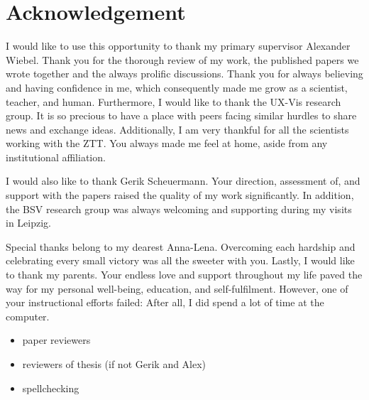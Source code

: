 %
\chapter*{Acknowledgement}
\label{sec:acknowledgement}
\vspace*{-10mm}

I would like to use this opportunity to thank my primary supervisor Alexander Wiebel. Thank you for the thorough review of my work, the published papers we wrote together and the always prolific discussions. Thank you for always believing and having confidence in me, which consequently made me grow as a scientist, teacher, and human. Furthermore, I would like to thank the UX-Vis research group. It is so precious to have a place with peers facing similar hurdles to share news and exchange ideas. Additionally, I am very thankful for all the scientists working with the ZTT. You always made me feel at home, aside from any institutional affiliation.

I would also like to thank Gerik Scheuermann. Your direction, assessment of, and support with the papers raised the quality of my work significantly. In addition, the BSV research group was always welcoming and supporting during my visits in Leipzig.

Special thanks belong to my dearest Anna-Lena. Overcoming each hardship and celebrating every small victory was all the sweeter with you. Lastly, I would like to thank my parents. Your endless love and support throughout my life paved the way for my personal well-being, education, and self-fulfilment. However, one of your instructional efforts failed: After all, I did spend a lot of time at the computer.

\begin{itemize}
    \item paper reviewers
    \item reviewers of thesis (if not Gerik and Alex)
    \item spellchecking
\end{itemize}
